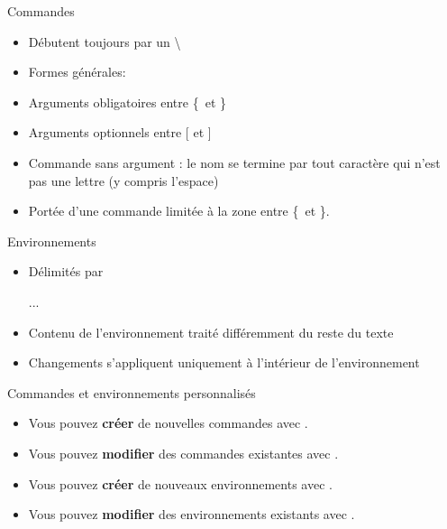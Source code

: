 \begin{frame}[fragile]{Commandes}
	\begin{itemize}
		\item Débutent toujours par un \textbackslash
		\item Formes générales:
\begin{codesource}
	\nomcommande
\end{codesource}
		\item Arguments obligatoires entre \{\ et \}
		\item Arguments optionnels entre [ et ]
		\item Commande sans argument : le nom se termine par tout caractère qui n’est pas une lettre (y
		compris l’espace)
		\item Portée d’une commande limitée à la zone entre \{\ et \}.
	\end{itemize}
\end{frame}

\begin{frame}[fragile,c]{Environnements}
	\begin{itemize}
		\item Délimités par
\begin{codesource}
	\begin{environnement}
		...
	\end{environnement}
\end{codesource}
		\item Contenu de l’environnement traité différemment du reste du texte
		\item Changements s’appliquent uniquement à l’intérieur de l’environnement
	\end{itemize}
\end{frame}

\begin{frame}[c]{Commandes et environnements personnalisés}
	\begin{itemize}
		\item Vous pouvez \textbf{créer} de nouvelles commandes avec .
		\item Vous pouvez \textbf{modifier} des commandes existantes avec .
		\item Vous pouvez \textbf{créer} de nouveaux environnements avec .
		\item Vous pouvez \textbf{modifier} des environnements existants avec .
	\end{itemize}
\end{frame}

